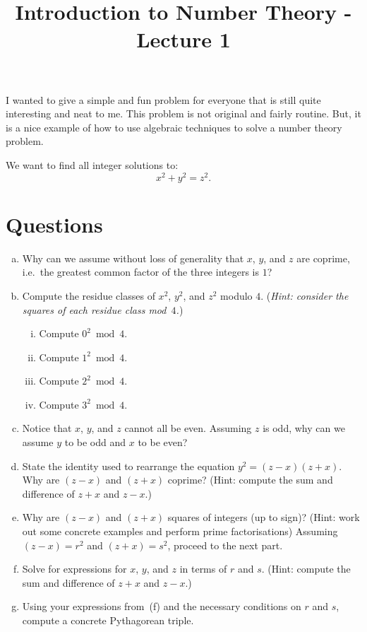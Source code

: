 \documentclass[12pt]{article}
\title{Introduction to Number Theory - Lecture 1}
\author{}
\date{}
\begin{document}
\maketitle

I wanted to give a simple and fun problem for everyone that is still quite interesting
and neat to me. This problem is not original and fairly routine.
But, it is a nice example of how to use algebraic techniques to solve a number theory problem.  

We want to find all integer solutions to:
\[
  x^2 + y^2 = z^2.
\]

\section*{Questions}

\begin{enumerate}[(a)]

  \item Why can we assume without loss of generality that $x$, $y$, and $z$
        are coprime, i.e.\ the greatest common factor of the three integers
        is $1$?

  \item Compute the residue classes of $x^2$, $y^2$, and $z^2$ modulo $4$.
        (\textit{Hint: consider the squares of each residue class mod~$4$.})

        \begin{enumerate}[(i)]
          \item Compute $0^2 \bmod 4$.
          \item Compute $1^2 \bmod 4$.
          \item Compute $2^2 \bmod 4$.
          \item Compute $3^2 \bmod 4$.
        \end{enumerate}

  \item Notice that $x$, $y$, and $z$ cannot all be even.  Assuming $z$ is
        odd, why can we assume $y$ to be odd and $x$ to be even?

  \item State the identity used to rearrange the equation
        $y^2 = (z - x)(z + x)$.  Why are $(z - x)$ and $(z + x)$ coprime? 
        (Hint: compute the sum and difference of $z+x$ and $z-x$.)

  \item Why are $(z - x)$ and $(z + x)$ squares of integers (up to sign)? 
        (Hint: work out some concrete examples and perform prime factorisations)
        Assuming $(z - x) = r^2$ and $(z + x) = s^2$, proceed to the next
        part.

  \item Solve for expressions for $x$, $y$, and $z$ in terms of $r$ and
        $s$. (Hint: compute the sum and difference of $z+x$ and $z-x$.)

  \item Using your expressions from~(f) and the necessary conditions on $r$
        and $s$, compute a concrete Pythagorean triple.

\end{enumerate}
\end{document}
